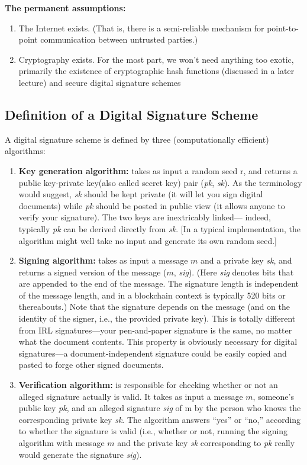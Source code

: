 \noindent
\textbf{The permanent assumptions:}
\begin{enumerate}
    \item The Internet exists. (That is, there is a semi-reliable mechanism for point-to-point
communication between untrusted parties.)
    \item Cryptography exists. For the most part, we won’t need anything too exotic, primarily
the existence of cryptographic hash functions (discussed in a later lecture) and secure
digital signature schemes 

\end{enumerate}
\newpage
\subsection{Definition of a Digital Signature Scheme}
A digital signature scheme is defined by three (computationally efficient) algorithms:\\
\begin{enumerate}
    \item \textbf{Key generation algorithm:} takes as input a random seed r, and returns a public key-private key(also called secret key) pair (\textit{pk}, \textit{sk}). As the terminology would suggest, \textit{sk} should be kept
    private (it will let you sign digital documents) while \textit{pk} should be posted in public
    view (it allows anyone to verify your signature). The two keys are inextricably linked—
    indeed, typically \textit{pk} can be derived directly from \textit{sk}.
    [In a typical implementation, the algorithm might well take no input and generate its
    own random seed.]
    \item \textbf{Signing algorithm:} takes as input a message $m$ and a private key \textit{sk}, and returns a signed version of the message ($m$, \textit{sig}). (Here \textit{sig} denotes bits that are appended to the end of the message. The signature length is independent of the message length,
    and in a blockchain context is typically 520 bits or thereabouts.)
    Note that the signature depends on the message (and on the identity of the signer, i.e.,
    the provided private key). This is totally different from IRL signatures—your pen-and-paper signature is the same, no matter what the document contents. This property
    is obviously necessary for digital signatures—a document-independent signature could
    be easily copied and pasted to forge other signed documents.

    \item \textbf{Verification algorithm:} is responsible for checking whether or not an alleged signature actually is valid. It takes as input a message $m$, someone’s public key \textit{pk}, and an
alleged signature \textit{sig} of m by the person who knows the corresponding private key \textit{sk}.
The algorithm answers “yes” or “no,” according to whether the signature is valid (i.e.,
whether or not, running the signing algorithm with message $m$ and the private key \textit{sk}
corresponding to \textit{pk} really would generate the signature \textit{sig}).
\end{enumerate}

